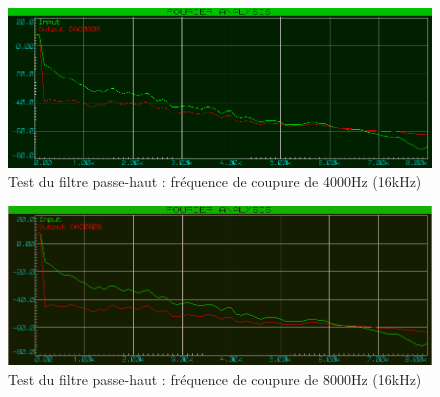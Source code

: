 \documentclass{article}
\begin{document}
    \begin{figure}[H]
        \centering
        \includegraphics[width=.75\textwidth]{./images/spectrum_high_pass_4000_16k.png}
        \caption{Test du filtre passe-haut : fréquence de coupure de 4000Hz (16kHz)}
    \end{figure}
    \begin{figure}[H]
        \centering
        \includegraphics[width=.75\textwidth]{./images/spectrum_high_pass_8000_16k.png}
        \caption{Test du filtre passe-haut : fréquence de coupure de 8000Hz (16kHz)}
    \end{figure}
\end{document}
